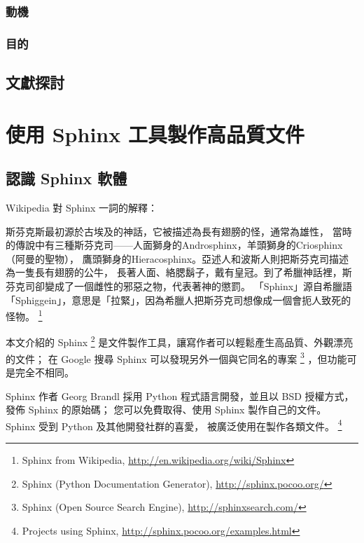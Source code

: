\documentclass[a4paper,12pt,english]{sphinxmanual}
\begin{document}
\subsection{動機}
\label{thesis:id4}

\subsection{目的}
\label{thesis:id5}

\section{文獻探討}
\label{thesis:id6}

\chapter{使用 Sphinx 工具製作高品質文件}
\label{sphinx:sphinx}\label{sphinx::doc}

\section{認識 Sphinx 軟體}
\label{sphinx_intro:sphinx}\label{sphinx_intro::doc}
Wikipedia 對 Sphinx 一詞的解釋：

\begin{DUlineblock}{0em}
\item[] 斯芬克斯最初源於古埃及的神話，它被描述為長有翅膀的怪，通常為雄性，
當時的傳說中有三種斯芬克司——人面獅身的Androsphinx，羊頭獅身的Criosphinx（阿曼的聖物），
鷹頭獅身的Hieracosphinx。亞述人和波斯人則把斯芬克司描述為一隻長有翅膀的公牛，
長著人面、絡腮鬍子，戴有皇冠。到了希臘神話裡，斯芬克司卻變成了一個雌性的邪惡之物，代表著神的懲罰。
「Sphinx」源自希臘語「Sphiggein」，意思是「拉緊」，因為希臘人把斯芬克司想像成一個會扼人致死的怪物。
\footnote{
Sphinx from Wikipedia, \href{http://en.wikipedia.org/wiki/Sphinx}{http://en.wikipedia.org/wiki/Sphinx}
}
\end{DUlineblock}

本文介紹的 Sphinx \footnote{
Sphinx (Python Documentation Generator), \href{http://sphinx.pocoo.org/}{http://sphinx.pocoo.org/}
} 是文件製作工具，讓寫作者可以輕鬆產生高品質、外觀漂亮的文件；
在 Google 搜尋 Sphinx 可以發現另外一個與它同名的專案 \footnote{
Sphinx (Open Source Search Engine), \href{http://sphinxsearch.com/}{http://sphinxsearch.com/}
} ，但功能可是完全不相同。

Sphinx 作者 Georg Brandl 採用 Python 程式語言開發，並且以 BSD 授權方式，發佈 Sphinx 的原始碼；
您可以免費取得、使用 Sphinx 製作自己的文件。 Sphinx 受到 Python 及其他開發社群的喜愛，
被廣泛使用在製作各類文件。 \footnote{
Projects using Sphinx, \href{http://sphinx.pocoo.org/examples.html}{http://sphinx.pocoo.org/examples.html}
}
\end{document}
